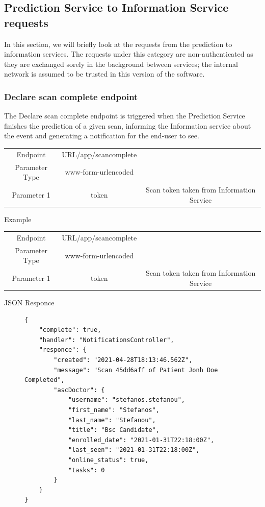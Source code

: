 			\subsection{Prediction Service to Information Service requests}
				In this section, we will briefly look at the requests from the prediction to information services. The requests under this category are non-authenticated 
				as they are exchanged sorely in the background between services; the internal network is assumed to be trusted in this version of the software.
				\subsubsection{Declare scan complete endpoint}
					The Declare scan complete endpoint is triggered when the Prediction Service finishes the prediction of a given scan, informing 
					the Information service about the event and generating a notification for the end-user to see.
					\begin{center}
						\begin{tabular}{ |c|c|c| } 
							\hline
							Endpoint & {{URL}}/app/scancomplete& \\
							Parameter Type & www-form-urlencoded  &\\
							Parameter 1 & token  & Scan token taken from Information Service\\
							\hline
						\end{tabular}
					\end{center}
					Example
					\begin{center}
						\begin{tabular}{ |c|c|c| } 
							\hline
							Endpoint & {{URL}}/app/scancomplete& \\
							Parameter Type & www-form-urlencoded  &\\
							Parameter 1 & token  & Scan token taken from Information Service\\
							\hline
						\end{tabular}
					\end{center}
					JSON Responce
					\begin{figure}[H]
						\iftrue
						\begin{lstlisting}[]
{
	"complete": true,
	"handler": "NotificationsController",
	"responce": {
		"created": "2021-04-28T18:13:46.562Z",
		"message": "Scan 45dd6aff of Patient Jonh Doe Completed",
		"ascDoctor": {
			"username": "stefanos.stefanou",
			"first_name": "Stefanos",
			"last_name": "Stefanou",
			"title": "Bsc Candidate",
			"enrolled_date": "2021-01-31T22:18:00Z",
			"last_seen": "2021-01-31T22:18:00Z",
			"online_status": true,
			"tasks": 0
		}
	}
}
						\end{lstlisting}
					\end{figure}
